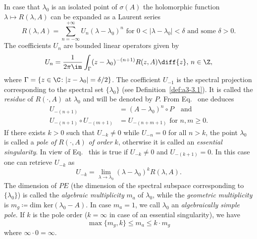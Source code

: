 \begin{example}\label{ex:a3-3.6}%

In case that $\lambda_{0}$ is an isolated point of\/ $\sigma(A)$ the holomorphic function $\lambda \mapsto R(\lambda,A)$ can be expanded as a Laurent series
\[
R(\lambda,A) = \sum_{n=-\infty}^{+\infty} U_{n}(\lambda - \lambda_{0})^{n} \text{ for } 0 < |\lambda - \lambda_{0}| < \delta \text{ and some } \delta > 0 .
\]
The coefficients $U_{n}$ are bounded linear operators given by
\begin{equation}\label{eq:a3-3.1}
	U_{n} = \frac{1}{2\pi\im }\int_{\Gamma} (z - \lambda_{0})^{-(n+1)}R(z,A)  \diff{z}, \, n \in \Z ,
\end{equation}
where $\Gamma = \{z \in \C \colon |z - \lambda_{0}| = \delta/2\}$.
The coefficient $U_{-1}$ is the spectral projection corresponding to the spectral set $\{\lambda_{0}\}$ (see Definition~\ref{def:a3-3.1}).
It is called the \emph{residue} of\/ $R(\cdot,A)$ at $\lambda_{0}$ and will be denoted by $P$.
From Eq.~ one deduces
\begin{equation}\label{eq:a3-3.2}
\begin{split}
U_{-(n+1)} &= (A - \lambda_{0})^{n} \circ P \quad \text{and} \\
U_{-(n+1)} \circ U_{-(m+1)} &= U_{-(n+m+1)} \text{ for } n, m \geq 0 .  
\end{split}
\end{equation}
If there exists $k > 0$ such that $U_{-k} \neq 0$ while $U_{-n} = 0$ for all $n > k$, the point $\lambda_{0}$ is called a \emph{pole of} $R(\cdot,A)$ \emph{of order} $k$, otherwise it is called an \emph{essential singularity}. 
In view of Eq.~ this is true if\/ $U_{-k} \neq 0$ and $U_{-(k+1)} = 0$.
In this case one can retrieve $U_{-k}$ as
\begin{equation}\label{eq:a3-3.3}
U_{-k} = \lim_{\lambda \to \lambda_{0}}(\lambda - \lambda_{0})^{k}R(\lambda,A) .
\end{equation}
The dimension of\/ $PE$ (\ie the dimension of the spectral subspace corresponding to $\{\lambda_{0}\}$) is called the \emph{algebraic multiplicity} 
$m_{a}$ of\/ $\lambda_{0}$, while the \emph{geometric multiplicity} 
is $m_{g} \coloneq \text{dim ker}(\lambda_{0} - A)$.
In case $m_{a} = 1$, we call $\lambda_{0}$ an \emph{algebraically simple pole}.
If\/ $k$ is the pole order ($k = \infty$ in case of an essential singularity), we have
\begin{equation}\label{eq:a3-3.4}
	\max\{m_{g},k\} \leq m_{a} \leq k \cdot m_{g}
\end{equation}
where $\infty \cdot 0 = \infty$.


\end{example}
